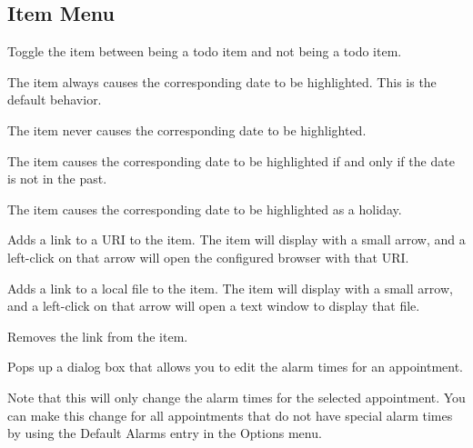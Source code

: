 \documentclass[a4paper,english]{article}
\begin{document}
    \subsection{Item Menu}
        \begin{Description}\setlength{\itemsep}{0cm}
        \item[Todo]
            Toggle the item between being a todo item and not being a
            todo item.

        \item[Always Highlight]
            The item always causes the corresponding date to be
            highlighted.  This is the default behavior.

        \item[Never Highlight]
            The item never causes the corresponding date to be
            highlighted.

        \item[Highlight Future]
            The item causes the corresponding date to be highlighted
            if and only if the date is not in the past.

        \item[Holiday]
            The item causes the corresponding date to be highlighted
            as a holiday.

        \item[Link to Web Document]
            Adds a link to a URI to the item. The item will display with
            a small arrow, and a left-click on that arrow will open
            the configured browser with that URI.

        \item[Link to Local File]
            Adds a link to a local file to the item. The item will display
            with a small arrow, and a left-click on that arrow will open
            a text window to display that file.

        \item[Remove Link]
            Removes the link from the item.

        \item[Change Alarms]
            Pops up a dialog box that allows you to edit the
            alarm times for an appointment.

            Note that this will only change the alarm times for the
            selected appointment.  You can make this change for all
            appointments that do not have special alarm times by using
            the Default Alarms entry in the Options menu.


\end{Description}
\end{document}
